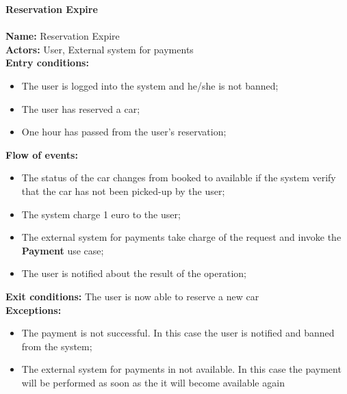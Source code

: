 \textbf{Reservation Expire}\\
\\
\textbf{Name:} Reservation Expire\\
\textbf{Actors:} User, External system for payments\\
\textbf{Entry conditions:}
\begin{itemize}
\item The user is logged into the system and he/she is not banned;
\item The user has reserved a car;
\item One hour has passed from the user's reservation;
\end{itemize}
\textbf{Flow of events:}
\begin{itemize}
\item The status of the car changes from booked to available if the system verify that the car has not been picked-up by the user;
\item The system charge 1 euro to the user;
\item The external system for payments take charge of the request and invoke the \textbf{Payment} use case;
\item The user is notified about the result of the operation;
\end{itemize}
\textbf{Exit conditions:} The user is now able to reserve a new car \\
\textbf{Exceptions:}
\begin{itemize}
\item The payment is not successful. In this case the user is notified and banned from the system;
\item The external system for payments in not available. In this case the payment will be performed as soon as the it will become available again
\end{itemize}

